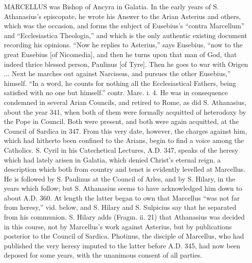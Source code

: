 
MARCELLUS
was Bishop of Ancyra in Galatia. In the early years of S. Athanasius's
episcopate, he wrote his Answer to the Arian Asterius and others,
which was the occasion, and forms the subject of Eusebius's ``contra
Marcellum'' and ``Ecclesiastica Theologia,'' and which is the only
authentic existing document recording his opinions. ``Now he replies to
Asterius,'' says Eusebius, ``now to the great Eusebius [of Nicomedia],
and then he turns upon that man of God, that indeed thrice blessed
person, Paulinus [of Tyre]. Then he goes to war with Origen ... Next
he marches out against Narcissus, and pursues the other Eusebius,''
himself. ``In a word, he counts for nothing all the Ecclesiastical
Fathers, being satisfied with no one but himself.'' contr. Marc. i. 4.
He was in consequence condemned in several Arian Councils, and retired
to Rome, as did S. Athanasius, about the year 341, when both of them
were formally acquitted of heterodoxy by the Pope in Council. Both
were present, and both were again acquitted, at the Council of Sardica
in 347. From this very date, however, the charges against him, which
had hitherto been confined to the Arians, begin to find a voice among
the Catholics. S. Cyril in his Catechetical Lectures, A.D.
347, speaks of the heresy which had lately arisen in Galatia, which
denied Christ's eternal reign, a description which both from
country and tenet is evidently levelled at Marcellus. He is followed
by S. Paulinus at the Council of Arles, and by S. Hilary, in the years
which follow; but S. Athanasius seems to have acknowledged him down to
about A.D. 360. At length the latter began to own that Marcellus ``was
not far from heresy,'' vid. below, and S. Hilary and S. Sulpicius say
that he separated from his communion. S. Hilary adds (Fragm. ii. 21)
that Athanasius was decided in this course, not by Marcellus's work
against Asterius, but by publications posterior to the Council of
Sardica. Photinus, the disciple of Marcellus, who had published the
very heresy imputed to the latter before A.D.
345, had now been deposed for some years, with the unanimous consent
of all parties.

